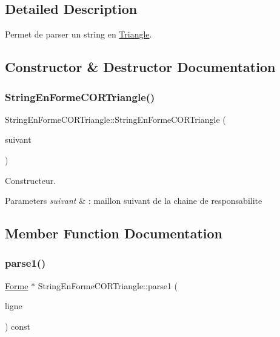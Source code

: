 \subsection{Detailed Description}
Permet de parser un string en \mbox{\hyperlink{class_triangle}{Triangle}}. 

\subsection{Constructor \& Destructor Documentation}
\mbox{\label{class_string_en_forme_c_o_r_triangle_ad8282a5aafd00f47d185b276637f00ff}} 
\subsubsection{\texorpdfstring{StringEnFormeCORTriangle()}{StringEnFormeCORTriangle()}}
{\footnotesize\ttfamily String\+En\+Forme\+C\+O\+R\+Triangle\+::\+String\+En\+Forme\+C\+O\+R\+Triangle (\begin{DoxyParamCaption}\item[{\mbox{\hyperlink{class_string_en_forme_c_o_r}{String\+En\+Forme\+C\+OR}} $\ast$}]{suivant }\end{DoxyParamCaption})\hspace{0.3cm}{\ttfamily [inline]}}



Constructeur. 


\begin{DoxyParams}{Parameters}
{\em suivant} & \+: maillon suivant de la chaine de responsabilite \\
\hline
\end{DoxyParams}


\subsection{Member Function Documentation}
\mbox{\label{class_string_en_forme_c_o_r_triangle_aa8ef1e1cedf6e3314209b0ed695d4416}} 
\subsubsection{\texorpdfstring{parse1()}{parse1()}}
{\footnotesize\ttfamily \mbox{\hyperlink{class_forme}{Forme}} $\ast$ String\+En\+Forme\+C\+O\+R\+Triangle\+::parse1 (\begin{DoxyParamCaption}\item[{const string \&}]{ligne }\end{DoxyParamCaption}) const\hspace{0.3cm}{\ttfamily [virtual]}}



